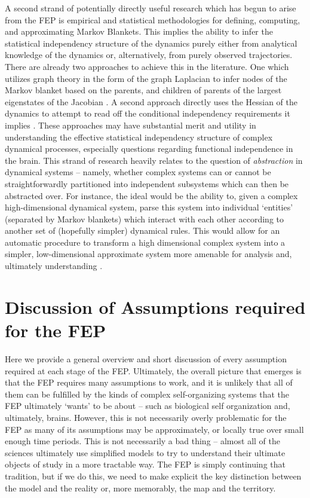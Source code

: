 A second strand of potentially directly useful research which has begun to arise from the FEP is empirical and statistical methodologies for defining, computing, and approximating Markov Blankets. This implies the ability to infer the statistical independency structure of the dynamics purely either from analytical knowledge of the dynamics or, alternatively, from purely observed trajectories. There are already two approaches to achieve this in the literature. One which utilizes graph theory in the form of the graph Laplacian to infer nodes of the Markov blanket based on the parents, and children of parents of the largest eigenstates of the Jacobian \citep{palacios2017biological,friston2013life, friston2020parcels}. A second approach directly uses the Hessian of the dynamics to attempt to read off the conditional independency requirements it implies \citep{friston2020parcels}. These approaches may have substantial merit and utility in understanding the effective statistical independency structure of complex dynamical processes, especially questions regarding functional independence in the brain. This strand of research heavily relates to the question of \emph{abstraction} in dynamical systems -- namely, whether complex systems can or cannot be straightforwardly partitioned into independent subsystems which can then be abstracted over. For instance, the ideal would be the ability to, given a complex high-dimensional dynamical system, parse this system into individual `entities' (separated by Markov blankets) which interact with each other according to another set of (hopefully simpler) dynamical rules. This would allow for an automatic procedure to transform a high dimensional complex system into a simpler, low-dimensional approximate system more amenable for analysis and, ultimately understanding \citep{friston2013life,parr2020modules,friston2007parcels}.

\section{Discussion of Assumptions required for the FEP}
Here we provide a general overview and short discussion of every assumption required at each stage of the FEP. Ultimately, the overall picture that emerges is that the FEP requires many assumptions to work, and it is unlikely that all of them can be fulfilled by the kinds of complex self-organizing systems that the FEP ultimately `wants' to be about -- such as biological self organization and, ultimately, brains. However, this is not necessarily overly problematic for the FEP as many of its assumptions may be approximately, or locally true over small enough time periods. This is not necessarily a bad thing -- almost all of the sciences ultimately use simplified models to try to understand their ultimate objects of study in a more tractable way. The FEP is simply continuing that tradition, but if we do this, we need to make explicit the key distinction between the model and the reality or, more memorably, the map and the territory.

